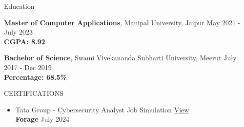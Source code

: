 \documentclass{resume} %
\begin{document}
\begin{rSection}{Education}

{\bf Master of Computer Applications}, Manipal University, Jaipur \hfill {May 2021 - July 2023}\\
\textbf{CGPA: 8.92}

{\bf Bachelor of Science}, Swami Vivekananda Subharti University, Meerut \hfill {July 2017 - Dec 2019}\\
\textbf{Percentage: 68.5\%}



\end{rSection}
\begin{rSection}{CERTIFICATIONS}
\begin{itemize}
    \item Tata Group - Cybersecurity Analyst Job Simulation \hfill \href{https://forage-uploads-prod.s3.amazonaws.com/completion-certificates/Tata/gmf3ypEXBj2wvfQWC_Tata%20Group_PynkGwAqrec2LCHy3_1719852016860_completion_certificate.pdf}{View}\\
    \textbf{Forage} \hfill July 2024
\end{itemize}
\end{rSection}
\end{document}
